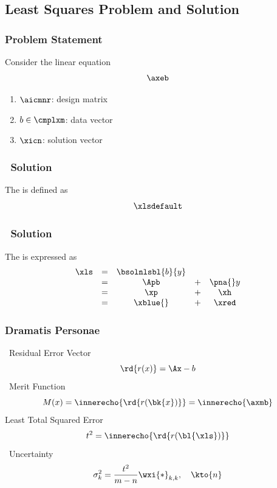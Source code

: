 \subsection{Least Squares Problem and Solution}

\begin{frame}\frametitle{Problem Statement}
Consider the linear equation
$$\axeb$$
\begin{enumerate}
	\item $\aicmnr$: design matrix
	\item $b\in\cmplxm$: data vector
	\item $\xicn$: solution vector
\end{enumerate}
\end{frame}
%
\begin{frame}\frametitle{\lsq \ Solution}
The  is defined as
$$\xlsdefault$$
\end{frame}


\begin{frame}\frametitle{\lsq \ Solution}
The  is expressed as
\begin{equation}
		\begin{array}{cccccl}
			\xls 
			& = & \bsolnlsbl{b}{y}  \\
			& = & \Apb & + & \pna{}y \\%
			& = & \xp & + & \xh \\
			& = & \xblue{} & + & \xred
		\end{array}
\label{eq:definition:general lsq solution}
\end{equation}
\end{frame}

\begin{frame}\frametitle{Dramatis Personae}
%
\lsq \ Residual Error Vector
%
\begin{equation}
	\rd{r(x)} = \Ax - b
\end{equation}
%
\lsq \ Merit Function
%
\begin{equation}
	M(x) = \innerecho{\rd{r(\bk{x})}} = \innerecho{\axmb}
\end{equation}
%
Least Total Squared Error
%
\begin{equation}
	t^{2} = \innerecho{\rd{r(\bl{\xls})}}
\end{equation}
%
\lsq \ Uncertainty 
%
\begin{equation}
	\sigma^{2}_{k} =  \frac{t^{2}} {m-n} \wxi{*}_{k,k}, \quad \kto{n}
\end{equation}
%
\end{frame}

